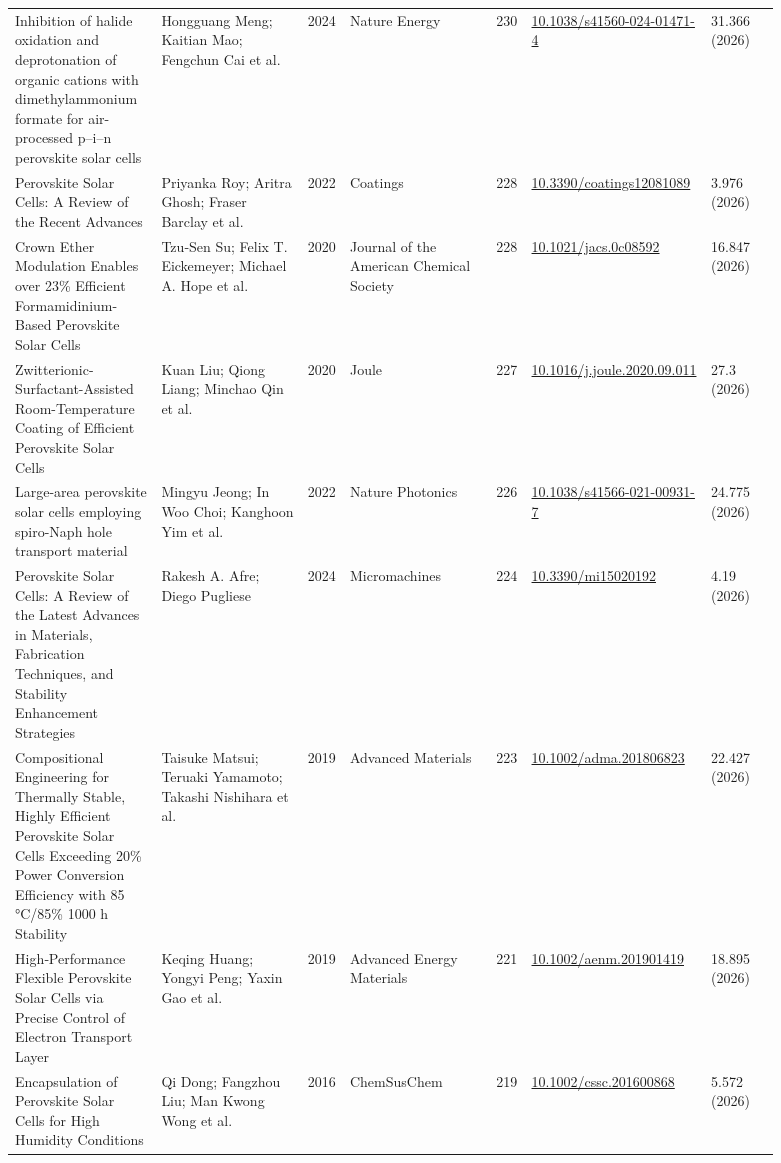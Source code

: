 \documentclass[10pt,a4paper]{article}
\begin{document}
{\begin{longtable}{p{0.197\linewidth}p{0.197\linewidth}p{0.043\linewidth}p{0.197\linewidth}p{0.043\linewidth}p{0.117\linewidth}p{0.098\linewidth}}
Inhibition of halide oxidation and deprotonation of organic cations with dimethylammonium formate for air-processed p–i–n perovskite solar cells & Hongguang Meng; Kaitian Mao; Fengchun Cai et al. & 2024 & Nature Energy & 230 & \href{https://doi.org/10.1038/s41560-024-01471-4}{10.1038/s41560-024-01471-4} & 31.366 (2026) \\
Perovskite Solar Cells: A Review of the Recent Advances & Priyanka Roy; Aritra Ghosh; Fraser Barclay et al. & 2022 & Coatings & 228 & \href{https://doi.org/10.3390/coatings12081089}{10.3390/coatings12081089} & 3.976 (2026) \\
Crown Ether Modulation Enables over 23\% Efficient Formamidinium-Based Perovskite Solar Cells & Tzu‐Sen Su; Felix T. Eickemeyer; Michael A. Hope et al. & 2020 & Journal of the American Chemical Society & 228 & \href{https://doi.org/10.1021/jacs.0c08592}{10.1021/jacs.0c08592} & 16.847 (2026) \\
Zwitterionic-Surfactant-Assisted Room-Temperature Coating of Efficient Perovskite Solar Cells & Kuan Liu; Qiong Liang; Minchao Qin et al. & 2020 & Joule & 227 & \href{https://doi.org/10.1016/j.joule.2020.09.011}{10.1016/j.joule.2020.09.011} & 27.3 (2026) \\
Large-area perovskite solar cells employing spiro-Naph hole transport material & Mingyu Jeong; In Woo Choi; Kanghoon Yim et al. & 2022 & Nature Photonics & 226 & \href{https://doi.org/10.1038/s41566-021-00931-7}{10.1038/s41566-021-00931-7} & 24.775 (2026) \\
Perovskite Solar Cells: A Review of the Latest Advances in Materials, Fabrication Techniques, and Stability Enhancement Strategies & Rakesh A. Afre; Diego Pugliese & 2024 & Micromachines & 224 & \href{https://doi.org/10.3390/mi15020192}{10.3390/mi15020192} & 4.19 (2026) \\
Compositional Engineering for Thermally Stable, Highly Efficient Perovskite Solar Cells Exceeding 20\% Power Conversion Efficiency with 85 °C/85\% 1000 h Stability & Taisuke Matsui; Teruaki Yamamoto; Takashi Nishihara et al. & 2019 & Advanced Materials & 223 & \href{https://doi.org/10.1002/adma.201806823}{10.1002/adma.201806823} & 22.427 (2026) \\
High‐Performance Flexible Perovskite Solar Cells via Precise Control of Electron Transport Layer & Keqing Huang; Yongyi Peng; Yaxin Gao et al. & 2019 & Advanced Energy Materials & 221 & \href{https://doi.org/10.1002/aenm.201901419}{10.1002/aenm.201901419} & 18.895 (2026) \\
Encapsulation of Perovskite Solar Cells for High Humidity Conditions & Qi Dong; Fangzhou Liu; Man Kwong Wong et al. & 2016 & ChemSusChem & 219 & \href{https://doi.org/10.1002/cssc.201600868}{10.1002/cssc.201600868} & 5.572 (2026) \\

\end{longtable}}
\end{document}
